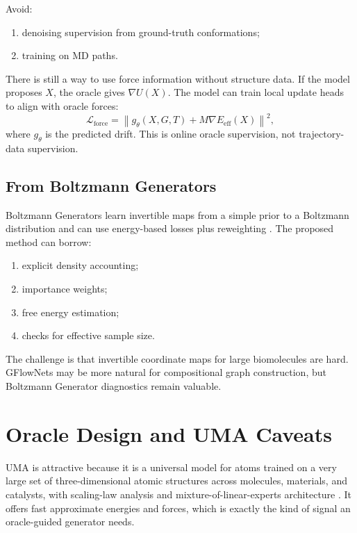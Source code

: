 \documentclass[11pt]{article}
\begin{document}
Avoid:
\begin{enumerate}[leftmargin=2em]
  \item denoising supervision from ground-truth conformations;
  \item training on MD paths.
\end{enumerate}

There is still a way to use force information without structure data. If the model proposes $X$, the oracle gives $\nabla U(X)$. The model can train local update heads to align with oracle forces:
\[
\mathcal{L}_{\mathrm{force}}=
\left\|
g_\theta(X,G,T)+M\nabla E_{\mathrm{eff}}(X)
\right\|^2,
\]
where $g_\theta$ is the predicted drift. This is online oracle supervision, not trajectory-data supervision.

\subsection{From Boltzmann Generators}

Boltzmann Generators learn invertible maps from a simple prior to a Boltzmann distribution and can use energy-based losses plus reweighting \cite{noe2019boltzmann}. The proposed method can borrow:
\begin{enumerate}[leftmargin=2em]
  \item explicit density accounting;
  \item importance weights;
  \item free energy estimation;
  \item checks for effective sample size.
\end{enumerate}

The challenge is that invertible coordinate maps for large biomolecules are hard. GFlowNets may be more natural for compositional graph construction, but Boltzmann Generator diagnostics remain valuable.

\section{Oracle Design and UMA Caveats}

UMA is attractive because it is a universal model for atoms trained on a very large set of three-dimensional atomic structures across molecules, materials, and catalysts, with scaling-law analysis and mixture-of-linear-experts architecture \cite{wood2025uma}. It offers fast approximate energies and forces, which is exactly the kind of signal an oracle-guided generator needs.
\end{document}
